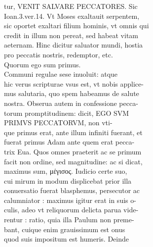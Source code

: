 \documentclass{article}
\begin{document}
\begin{pages}
                tur, VENIT SALVARE PECCATORES. Sic \\
                Ioan.3.ver.14. Vt Moses exaltauit serpentem, \\
                sic oportet exaltari filium hominis, vt omnis qui \\
                credit in illum non pereat, sed habeat vitam \\
                aeternam. Hinc dicitur saluator mundi, hostia \\
                pro peccatis nostris, redemptor, etc. \\
                Quorum ego sum primus. \\
                Communi regulae sese inuoluit: atque \\
                hic verus scripturae vsus est, vt nobis applice- \\
                mus salutaria, quo spem habeamus de salute \\
                nostra. Obserua autem in confessione pecca- \\
                torum promptitudinem: dicit, EGO SVM \\
                PRIMVS PECCATORVM, non vti- \\
                que primus erat, ante illum infiniti fuerant, et \\
                fuerat primus Adam ante quem erat pecca- \\
                trix Eua. Quos omnes praeterit ac se primum \\
                facit non ordine, sed magnitudine: ac si dicat, \\
                maximus sum, μέγισος. Iudicio certe suo, \\
                cui mirum in modum displicebat prior illa \\
                conuersatio fuerat blasphemus, persecutor ac \\
                calumniator : maximus igitur erat in suis o- \\
                culis, adeo vt reliquorum delicta parua vide- \\
                rentur : ratio, quia illa Paulum non preme- \\
                bant, cuique enim grauissimum est onus \\
                quod suis impositum est humeris. Deinde \\

\end{pages}
\end{document}
